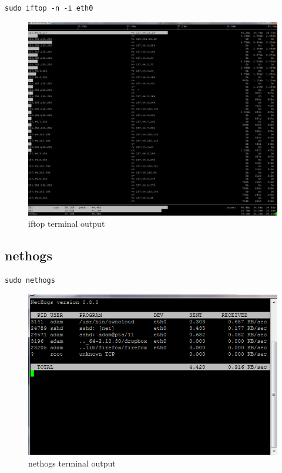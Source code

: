 \begin{lstlisting}
sudo iftop -n -i eth0
\end{lstlisting}

\begin{figure}[!th]
\centering
\includegraphics[scale=0.35]{./supportfiles/iftop.png}
\caption{iftop terminal output}
\label{fig:iftop}
\end{figure}

\subsection{nethogs}

\begin{lstlisting}
sudo nethogs
\end{lstlisting}

\begin{figure}[!th]
\centering
\includegraphics[scale=0.75]{./supportfiles/nethogs.png}
\caption{nethogs terminal output}
\label{fig:nethog}
\end{figure}


